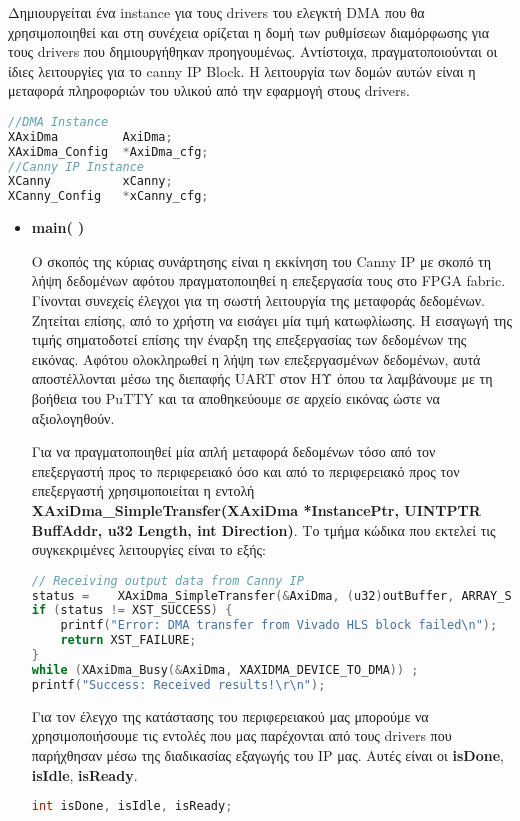 Δημιουργείται ένα instance για τους drivers του ελεγκτή DMA που θα χρησιμοποιηθεί και στη συνέχεια ορίζεται η δομή των ρυθμίσεων διαμόρφωσης για τους drivers που δημιουργήθηκαν προηγουμένως. Αντίστοιχα, πραγματοποιούνται οι ίδιες λειτουργίες για το canny IP Block. Η λειτουργία των δομών αυτών είναι η μεταφορά πληροφοριών του υλικού από την εφαρμογή στους drivers.
\begin{lstlisting}[language=C++,belowskip=-0.3\baselineskip]
//DMA Instance
XAxiDma 		AxiDma;
XAxiDma_Config	*AxiDma_cfg;
//Canny IP Instance
XCanny			xCanny;
XCanny_Config	*xCanny_cfg;
\end{lstlisting}
\begin{itemize}[label={},leftmargin=*]

\item \textbf{main( )}

Ο σκοπός της κύριας συνάρτησης είναι η εκκίνηση του Canny IP με σκοπό τη λήψη δεδομένων αφότου πραγματοποιηθεί η επεξεργασία τους στο FPGA fabric. Γίνονται συνεχείς έλεγχοι για τη σωστή λειτουργία της μεταφοράς δεδομένων. Ζητείται επίσης, από το χρήστη να εισάγει μία τιμή κατωφλίωσης. Η εισαγωγή της τιμής σηματοδοτεί επίσης την έναρξη της επεξεργασίας των δεδομένων της εικόνας. Αφότου ολοκληρωθεί η λήψη των επεξεργασμένων δεδομένων, αυτά αποστέλλονται μέσω της διεπαφής UART στον ΗΥ όπου τα λαμβάνουμε με τη βοήθεια του PuTTY και τα αποθηκεύουμε σε αρχείο εικόνας ώστε να αξιολογηθούν.

Για να πραγματοποιηθεί μία απλή μεταφορά δεδομένων τόσο από τον επεξεργαστή προς το περιφερειακό όσο και από το περιφερειακό προς τον επεξεργαστή χρησιμοποιείται η εντολή \textbf{XAxiDma\_SimpleTransfer(XAxiDma *InstancePtr, UINTPTR BuffAddr, u32 Length,	int Direction)}. Το τμήμα κώδικα που εκτελεί τις συγκεκριμένες λειτουργίες είναι το εξής:

\begin{lstlisting}[language=C++,belowskip=-0.3\baselineskip]
// Receiving output data from Canny IP
status = 	XAxiDma_SimpleTransfer(&AxiDma, (u32)outBuffer, ARRAY_SIZE*sizeof(int), XAXIDMA_DEVICE_TO_DMA);
if (status != XST_SUCCESS) {
	printf("Error: DMA transfer from Vivado HLS block failed\n");
	return XST_FAILURE;
}
while (XAxiDma_Busy(&AxiDma, XAXIDMA_DEVICE_TO_DMA)) ;
printf("Success: Received results!\r\n");
\end{lstlisting}

Για τον έλεγχο της κατάστασης του περιφερειακού μας μπορούμε να χρησιμοποιήσουμε τις εντολές που μας παρέχονται από τους drivers που παρήχθησαν μέσω της διαδικασίας εξαγωγής του IP μας. Αυτές είναι οι \textbf{isDone}, \textbf{isIdle}, \textbf{isReady}. \\
\begin{lstlisting}[language=C++,belowskip=-0.3\baselineskip]
int isDone, isIdle, isReady;


\end{lstlisting}
\end{itemize}
